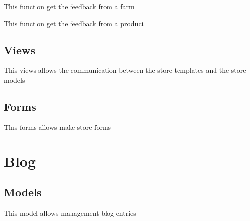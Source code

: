 \documentclass[letterpaper,10pt,english]{sphinxmanual}
\begin{document}

\begin{fulllineitems}
\label{modules/store:apps.store.models.getFeedbackFarm}
This function get the feedback from a farm

\end{fulllineitems}


\begin{fulllineitems}
\label{modules/store:apps.store.models.getFeedbackProduct}
This function get the feedback from a product

\end{fulllineitems}



\subsection{Views}
\label{modules/store:views}
This views allows the communication between the store templates and the store models
\label{modules/store:module-apps.store.views}

\subsection{Forms}
\label{modules/store:forms}
This forms allows make store forms
\label{modules/store:module-apps.store.forms}

\section{Blog}
\label{modules/blog:blog}\label{modules/blog::doc}

\subsection{Models}
\label{modules/blog:models}
This model allows management blog entries
\label{modules/blog:module-apps.blog.models}
\end{document}
